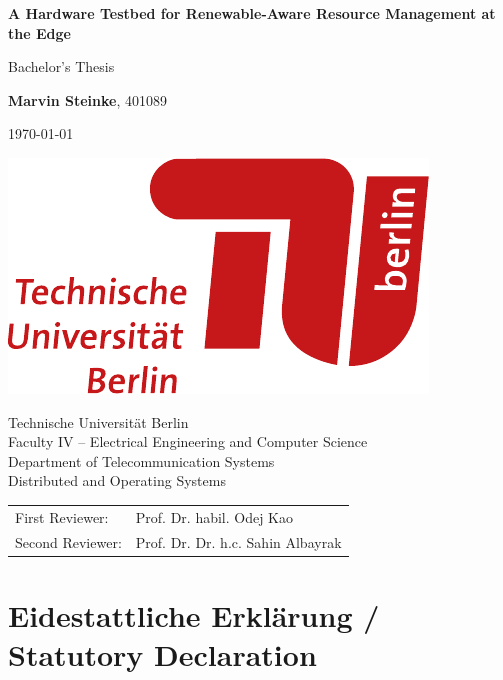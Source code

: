 \documentclass[a4paper, hidelinks]{report}
\begin{document}
\begin{titlepage}
    \begin{center}
        \LARGE
        \vspace*{2em}
        \textbf{
            A Hardware Testbed for Renewable-Aware Resource Management at the
            Edge
        }

        \Large
        \vspace{1em}
        Bachelor's Thesis

        \vspace{4em}
        \textbf{Marvin Steinke}, 401089

        \vspace{1em}
        \today

        \vfill
        \includegraphics[scale=0.8]{tu-logo}

        \normalsize
        \vspace{2em}
        Technische Universität Berlin\\
        Faculty IV -- Electrical Engineering and Computer Science\\
        Department of Telecommunication Systems\\
        Distributed and Operating Systems\\

        \vspace{2em}
        \begin{tabular}{l l}
            First Reviewer: & Prof. Dr. habil. Odej Kao\\
            Second Reviewer: & Prof. Dr. Dr. h.c. Sahin Albayrak
        \end{tabular}
    \end{center}
\end{titlepage}

\chapter*{
    Eidestattliche Erklärung /\\
    Statutory Declaration
}
\end{document}
